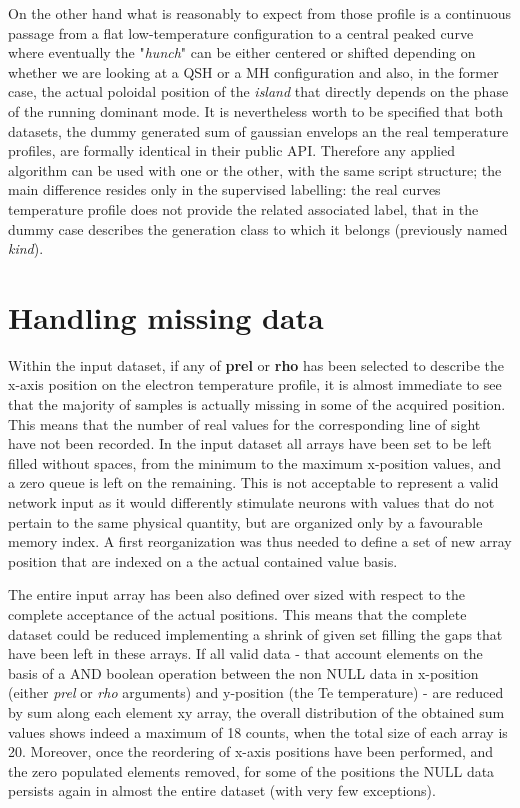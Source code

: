 On the other hand what is reasonably to expect from those profile is a continuous passage from a flat low-temperature configuration to a central peaked curve where eventually the "\textit{hunch}" can be either centered or shifted depending on whether we are looking at a QSH or a MH configuration and also, in the former case, the actual poloidal position of the \textit{island} that directly depends on the phase of the running dominant mode.
It is nevertheless worth to be specified that both datasets, the dummy generated sum of gaussian envelops an the real temperature profiles, are formally identical in their public API. Therefore  any applied algorithm can be used with one or the other, with the same script structure; the main difference resides only in the supervised labelling: the real curves temperature profile does not provide the related associated label, that in the dummy case describes the generation class to which it belongs (previously named \textit{kind}).

\section{Handling missing data}

Within the input dataset, if any of \textbf{prel} or \textbf{rho} has been selected to describe the x-axis position on the electron temperature profile, it is almost immediate to see that the majority of samples is actually missing in some of the acquired position. This means that the number of real values for the corresponding line of sight have not been recorded. 
In the input dataset all arrays have been set to be left filled without spaces, from the minimum to the maximum x-position values, and a zero queue is left on the remaining. This is not acceptable to represent a valid network input as it would differently stimulate neurons with values that do not pertain to the same physical quantity, but are organized only by a favourable memory index.
A first reorganization was thus needed to define a set of new array position that are indexed on a the actual contained value basis.

The entire input array has been also defined over sized with respect to the complete acceptance of the actual positions. This means that the complete dataset could be reduced implementing a shrink of given set filling the gaps that have been left in these arrays. If all valid data - that account elements on the basis of a AND boolean operation between the non NULL data in x-position (either \textit{prel} or \textit{rho} arguments) and y-position (the Te temperature) - are reduced by sum along each element xy array, the overall distribution of the obtained sum values shows indeed a maximum of 18 counts, when the total size of each array is 20. Moreover, once the reordering of x-axis positions have been performed, and the zero populated elements removed, for some of the positions the NULL data persists again in almost the entire dataset (with very few exceptions). 

